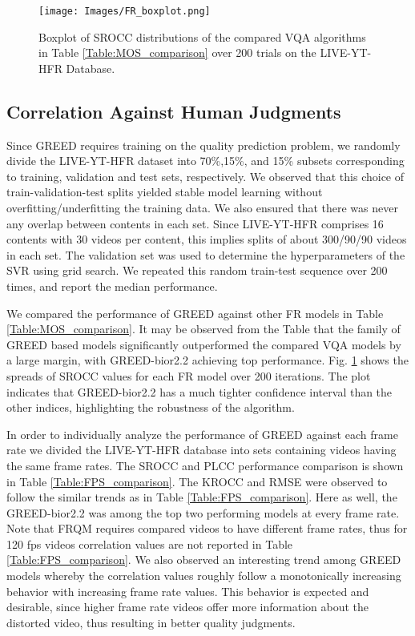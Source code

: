 \documentclass[journal]{IEEEtran}
\begin{document}
\begin{figure}[t]
    \centering
    \texttt{[image: Images/FR\_boxplot.png]}
    \caption{Boxplot of SROCC distributions of the compared VQA algorithms in Table \ref{Table:MOS_comparison} over 200 trials on the LIVE-YT-HFR Database.}
    \label{fig:FR_boxplot}
\end{figure}

\subsection{Correlation Against Human Judgments}
Since GREED requires training on the quality prediction problem, we randomly divide the LIVE-YT-HFR dataset into 70\%,15\%, and 15\% subsets corresponding to training, validation and test sets, respectively. We observed that this choice of train-validation-test splits yielded stable model learning without overfitting/underfitting the training data. We also ensured that there was never any overlap between contents in each set. Since LIVE-YT-HFR comprises 16 contents with 30 videos per content, this implies splits of about 300/90/90 videos in each set. The validation set was used to determine the hyperparameters of the SVR using grid search. We repeated this random train-test sequence over 200 times, and report the median performance.

We compared the performance of GREED against other FR models in Table \ref{Table:MOS_comparison}. It may be observed from the Table that the family of GREED based models significantly outperformed the compared VQA models by a large margin, with GREED-bior2.2 achieving top performance. Fig. \ref{fig:FR_boxplot} shows the spreads of SROCC values for each FR model over 200 iterations. The plot indicates that GREED-bior2.2 has a much tighter confidence interval than the other indices, highlighting the robustness of the algorithm.

In order to individually analyze the performance of GREED against each frame rate we divided the LIVE-YT-HFR database into sets containing videos having the same frame rates. The SROCC and PLCC performance comparison is shown in Table \ref{Table:FPS_comparison}. The KROCC and RMSE were observed to follow the similar trends as in Table \ref{Table:FPS_comparison}. Here as well, the GREED-bior2.2 was among the top two performing models at every frame rate. Note that FRQM requires compared videos to have different frame rates, thus for 120 fps videos correlation values are not reported in Table \ref{Table:FPS_comparison}. We also observed an interesting trend among GREED models whereby the correlation values roughly follow a monotonically increasing behavior with increasing frame rate values. This behavior is expected and desirable, since higher frame rate videos offer more information about the distorted video, thus resulting in better quality judgments.
\end{document}
